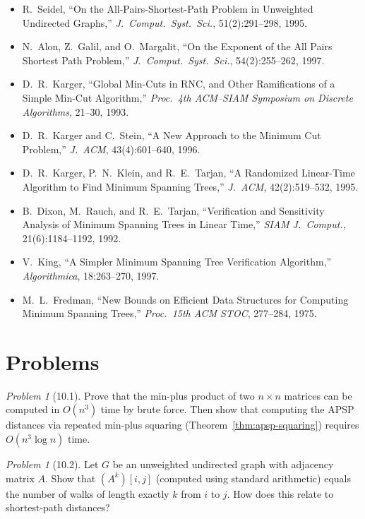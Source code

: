 \documentclass[twoside,12pt]{book}
\theoremstyle{plain}
\theoremstyle{definition}
\theoremstyle{remark}
\newtheorem{problem}[theorem]{Problem}
\begin{document}
\begin{itemize}[nosep]
    \item R.~Seidel, ``On the All-Pairs-Shortest-Path Problem in Unweighted Undirected Graphs,'' \textit{J.\ Comput.\ Syst.\ Sci.}, 51(2):291--298, 1995.
    \item N.~Alon, Z.~Galil, and O.~Margalit, ``On the Exponent of the All Pairs Shortest Path Problem,'' \textit{J.\ Comput.\ Syst.\ Sci.}, 54(2):255--262, 1997.
    \item D.~R.~Karger, ``Global Min-Cuts in RNC, and Other Ramifications of a Simple Min-Cut Algorithm,'' \textit{Proc.\ 4th ACM--SIAM Symposium on Discrete Algorithms}, 21--30, 1993.
    \item D.~R.~Karger and C.~Stein, ``A New Approach to the Minimum Cut Problem,'' \textit{J.\ ACM}, 43(4):601--640, 1996.
    \item D.~R.~Karger, P.~N.~Klein, and R.~E.~Tarjan, ``A Randomized Linear-Time Algorithm to Find Minimum Spanning Trees,'' \textit{J.\ ACM}, 42(2):519--532, 1995.
    \item B.~Dixon, M.~Rauch, and R.~E.~Tarjan, ``Verification and Sensitivity Analysis of Minimum Spanning Trees in Linear Time,'' \textit{SIAM J.\ Comput.}, 21(6):1184--1192, 1992.
    \item V.~King, ``A Simpler Minimum Spanning Tree Verification Algorithm,'' \textit{Algorithmica}, 18:263--270, 1997.
    \item M.~L.~Fredman, ``New Bounds on Efficient Data Structures for Computing Minimum Spanning Trees,'' \textit{Proc.\ 15th ACM STOC}, 277--284, 1975.
\end{itemize}

\section*{Problems}
\label{sec:problems-10}

\begin{problem}[10.1]
Prove that the min-plus product of two $n \times n$ matrices can be computed in $O(n^3)$ time by brute force. Then show that computing the APSP distances via repeated min-plus squaring (Theorem~\ref{thm:apsp-squaring}) requires $O(n^3 \log n)$ time.
\end{problem}

\begin{problem}[10.2]
Let $G$ be an unweighted undirected graph with adjacency matrix $A$. Show that $(A^k)[i, j]$ (computed using standard arithmetic) equals the number of walks of length exactly $k$ from $i$ to $j$. How does this relate to shortest-path distances?
\end{problem}
\end{document}

